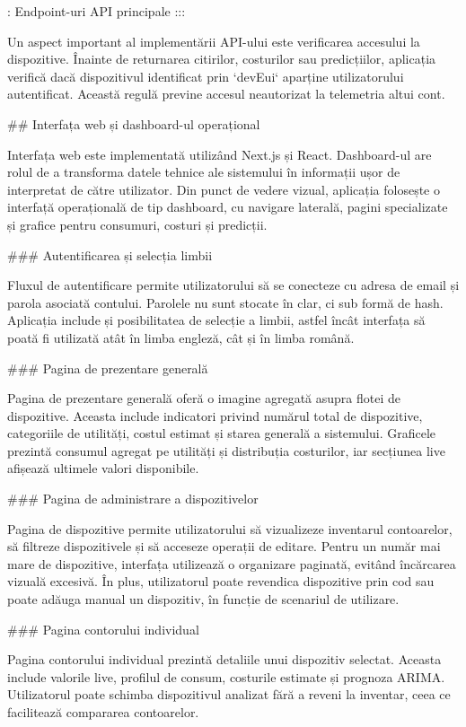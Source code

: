   : Endpoint-uri API principale
:::

Un aspect important al implementării API-ului este verificarea accesului
la dispozitive. Înainte de returnarea citirilor, costurilor sau
predicțiilor, aplicația verifică dacă dispozitivul identificat prin
`devEui` aparține utilizatorului autentificat. Această regulă previne
accesul neautorizat la telemetria altui cont.

## Interfața web și dashboard-ul operațional

Interfața web este implementată utilizând Next.js și React. Dashboard-ul
are rolul de a transforma datele tehnice ale sistemului în informații
ușor de interpretat de către utilizator. Din punct de vedere vizual,
aplicația folosește o interfață operațională de tip dashboard, cu
navigare laterală, pagini specializate și grafice pentru consumuri,
costuri și predicții.

### Autentificarea și selecția limbii

Fluxul de autentificare permite utilizatorului să se conecteze cu adresa
de email și parola asociată contului. Parolele nu sunt stocate în clar,
ci sub formă de hash. Aplicația include și posibilitatea de selecție a
limbii, astfel încât interfața să poată fi utilizată atât în limba
engleză, cât și în limba română.

### Pagina de prezentare generală

Pagina de prezentare generală oferă o imagine agregată asupra flotei de
dispozitive. Aceasta include indicatori privind numărul total de
dispozitive, categoriile de utilități, costul estimat și starea generală
a sistemului. Graficele prezintă consumul agregat pe utilități și
distribuția costurilor, iar secțiunea live afișează ultimele valori
disponibile.

### Pagina de administrare a dispozitivelor

Pagina de dispozitive permite utilizatorului să vizualizeze inventarul
contoarelor, să filtreze dispozitivele și să acceseze operații de
editare. Pentru un număr mai mare de dispozitive, interfața utilizează o
organizare paginată, evitând încărcarea vizuală excesivă. În plus,
utilizatorul poate revendica dispozitive prin cod sau poate adăuga
manual un dispozitiv, în funcție de scenariul de utilizare.

### Pagina contorului individual

Pagina contorului individual prezintă detaliile unui dispozitiv
selectat. Aceasta include valorile live, profilul de consum, costurile
estimate și prognoza ARIMA. Utilizatorul poate schimba dispozitivul
analizat fără a reveni la inventar, ceea ce facilitează compararea
contoarelor.

